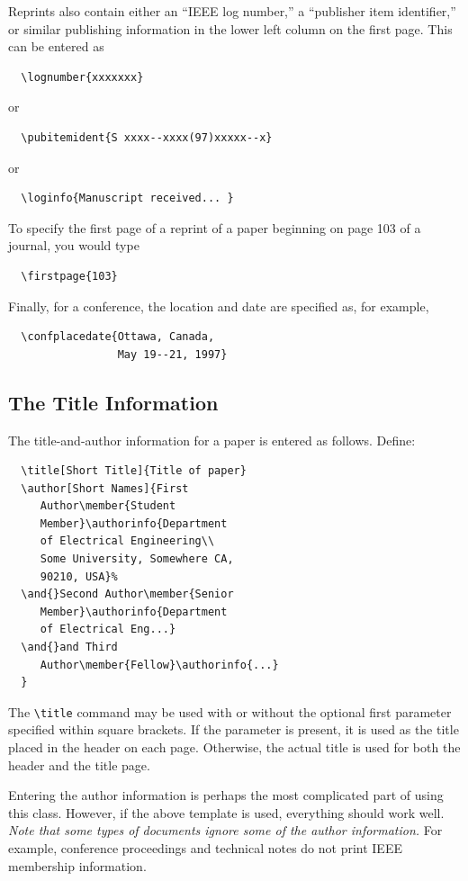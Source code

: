 \documentclass[%
	final,
	notitlepage,
	narroweqnarray,
	inline,
	twoside,
	]{ieee}
\begin{document}
Reprints also contain either an ``IEEE log number,'' a ``publisher
item identifier,'' or similar publishing information in the lower left
column on the first page. This can be entered as
\begin{verbatim}
  \lognumber{xxxxxxx}
\end{verbatim}
or
\begin{verbatim}
  \pubitemident{S xxxx--xxxx(97)xxxxx--x}
\end{verbatim}
or
\begin{verbatim}
  \loginfo{Manuscript received... }
\end{verbatim}
To specify the first page of a reprint of a paper beginning on page 
103 of a journal, you would type
\begin{verbatim}
  \firstpage{103}
\end{verbatim}
Finally, for a conference, the location and date are specified as, for
example,
\begin{verbatim}
  \confplacedate{Ottawa, Canada,  
                 May 19--21, 1997}
\end{verbatim}

\subsection{The Title Information}

The title-and-author information for a paper is entered as follows.
Define:
\begin{verbatim}
  \title[Short Title]{Title of paper}
  \author[Short Names]{First 
     Author\member{Student 
     Member}\authorinfo{Department 
     of Electrical Engineering\\ 
     Some University, Somewhere CA, 
     90210, USA}% 
  \and{}Second Author\member{Senior 
     Member}\authorinfo{Department 
     of Electrical Eng...}
  \and{}and Third 
     Author\member{Fellow}\authorinfo{...}
  }
\end{verbatim}

The \verb|\title| command may be used with or without the optional
first parameter specified within square brackets. If the parameter is
present, it is used as the title placed in the header on each page.
Otherwise, the actual title is used for both the header and the title
page.

Entering the author information is perhaps the most complicated part
of using this class. However, if the above template is used,
everything should work well. \emph{Note that some types of documents
ignore some of the author information.} For example, conference
proceedings and technical notes do not print IEEE membership
information.
\end{document}

